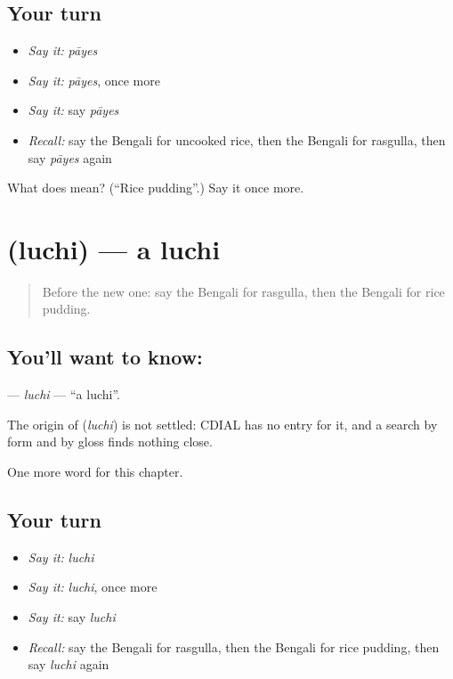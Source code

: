 \subsection*{Your turn}
\begin{itemize}
\raggedright
  \item \emph{Say it:} \emph{pāyes}
  \item \emph{Say it:} \emph{pāyes}, once more
  \item \emph{Say it:} say \emph{pāyes}
  \item \emph{Recall:} say the Bengali for uncooked rice, then the Bengali for rasgulla, then say \emph{pāyes} again
\end{itemize}

\begin{tcolorbox}[breakable,colback=teal!4,colframe=teal!35!black,title={Before you move on}]
What does  mean? (\textquotedblleft{}Rice pudding\textquotedblright{}.) Say it once more.
\end{tcolorbox}
\section[\texorpdfstring{\bn{লুচি} (luchi)}{লুচি (luchi)}]{ (luchi) — a luchi}

\label{lesson:BN-C118-luchi}



\begin{quote}
Before the new one: say the Bengali for rasgulla, then the Bengali for rice pudding.
\end{quote}

\subsection*{You'll want to know: }
\textbf{} — \emph{luchi} — \textquotedblleft{}a luchi\textquotedblright{}.

\begin{cousinweb}
The origin of \textbf{} (\emph{luchi}) is not settled: CDIAL has no entry for it, and a search by form and by gloss finds nothing close.
\end{cousinweb}

\begin{grammarlens}[title={What you've built}]
One more word for this chapter.
\end{grammarlens}

\subsection*{Your turn}
\begin{itemize}
\raggedright
  \item \emph{Say it:} \emph{luchi}
  \item \emph{Say it:} \emph{luchi}, once more
  \item \emph{Say it:} say \emph{luchi}
  \item \emph{Recall:} say the Bengali for rasgulla, then the Bengali for rice pudding, then say \emph{luchi} again
\end{itemize}

